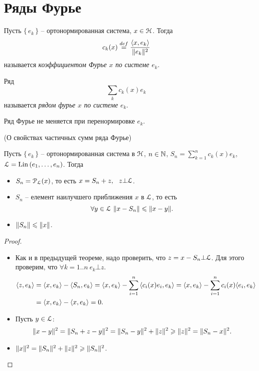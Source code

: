 \section{Ряды Фурье}

\begin{definition}
    Пусть $\{\,e_k\,\}$ -- ортонормированная система, $x \in \cH$. Тогда
    \[
        c_k(x) \defeq \frac{\scp{x}{e_k}}{\norm{e_k}^2}    
    \]
    называется \textit{коэффициентом Фурье $x$ по системе $e_k$}.
\end{definition}

\begin{definition}
    Ряд
    \[
        \sum_k{c_k(x) e_k}
    \]
    называется \textit{рядом фурье $x$ по системе $e_k$}.
\end{definition}

\begin{remark}
    Ряд Фурье не меняется при перенормировке $e_k$.
\end{remark}

\begin{theorem}(О свойствах частичных сумм ряда Фурье)

    Пусть $\{\,e_k\,\}$ -- ортонормированная система в $\cH$, $n \in \bN$,
    $S_n = \sum_{k = 1}^n{c_k(x) e_k}$, $\cL = \Lin{\parens*{e_1, \ldots, e_n}}$.
    Тогда
    \begin{itemize}
        \item $S_n = \cP_\cL(x)$, то есть $x = S_n + z,~~ z \bot \cL$.
        \item $S_n$ -- елемент наилучшего приближения $x$ в $\cL$, то есть
            \[
                \forall y \in \cL~ \norm{x - S_n} \leqslant \norm{x - y}
            .\]
        \item $\norm{S_n} \leqslant \norm{x}$.
    \end{itemize}
\end{theorem}
\begin{proof}
    \enewline
    \begin{itemize}
        \item Как и в предыдущей теореме, надо проверить, что $z = x - S_n \bot \cL$.
            Для этого проверим, что $\forall k = 1..n~ e_k \bot z$.
            \begin{align*}
                \scp{z}{e_k} 
                &= \scp{x}{e_k} - \scp{S_n}{e_k} = \scp{x}{e_k} -
                \sum_{i = 1}^n{\scp{c_i(x) e_i}{e_k}} = \scp{x}{e_k} -
                \sum_{i = 1}^n{c_i(x) \scp{e_i}{e_k}} \\
                &= \scp{x}{e_k} - \scp{x}{e_k} = 0
            .\end{align*}
        \item Пусть $y \in \cL$:
            \begin{align*}
                \norm{x - y}^2 = \norm{S_n + z - y}^2 = \norm{S_n - y}^2 + \norm{z}^2
                \geqslant \norm{z}^2 = \norm{S_n - x}^2
            .\end{align*}
        \item $\norm{x}^2 = \norm{S_n}^2 + \norm{z}^2 \geqslant \norm{S_n}^2$.
    \end{itemize}
\end{proof}

